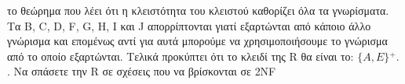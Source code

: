  το θεώρημα που λέει ότι η κλειστότητα του κλειστού καθορίζει όλα τα γνωρίσματα. Τα \foreignlanguage{english}{B, C, D, F, G, H, I} και \foreignlanguage{english}{J} απορρίπτονται γιατί εξαρτώνται από κάποιο άλλο γνώρισμα και επομένως αντί για αυτά μπορούμε να χρησιμοποιήσουμε το γνώρισμα από το οποίο εξαρτώνται.
Τελικά προκύπτει ότι το κλειδί της R θα είναι το: \foreignlanguage{english}{$\{A, E\}$}$^+$.
\hfill {}. Να σπάσετε την \foreignlanguage{english}{R} σε σχέσεις που να βρίσκονται σε \foreignlanguage{english}{2NF}